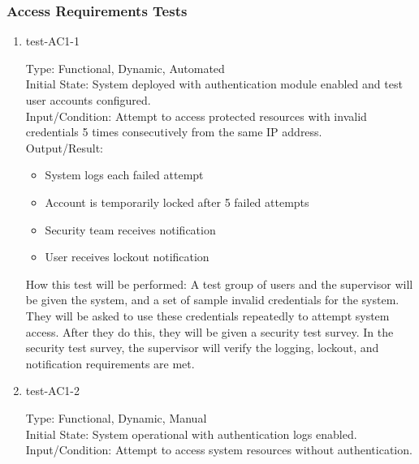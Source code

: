 \documentclass[12pt, titlepage]{article}
\begin{document}
\subsubsection{Access Requirements Tests} \label{section:4.3.1}

\begin{enumerate}

    \item{test-AC1-1\\} \label{test-AC1-1}
    
    Type: Functional, Dynamic, Automated\\
    
    Initial State: System deployed with authentication module enabled and test user accounts configured.\\
    
    Input/Condition: Attempt to access protected resources with invalid credentials 5 times consecutively from the same IP address.\\
    
    Output/Result: 
    \begin{itemize}
        \item System logs each failed attempt
        \item Account is temporarily locked after 5 failed attempts
        \item Security team receives notification
        \item User receives lockout notification
    \end{itemize}
    
    How this test will be performed: A test group of users and the supervisor will be given the system, and a set of sample invalid credentials for the system. They will be asked to use these credentials repeatedly to attempt system access. After they do this, they will be given a security test survey. In the security test survey, the supervisor will verify the logging, lockout, and notification requirements are met.

    \item{test-AC1-2\\}  \label{test-AC1-2}
    
    Type: Functional, Dynamic, Manual\\
    
    Initial State: System operational with authentication logs enabled.\\
    
    Input/Condition: Attempt to access system resources without authentication.\\
    

\end{enumerate}
\end{document}
